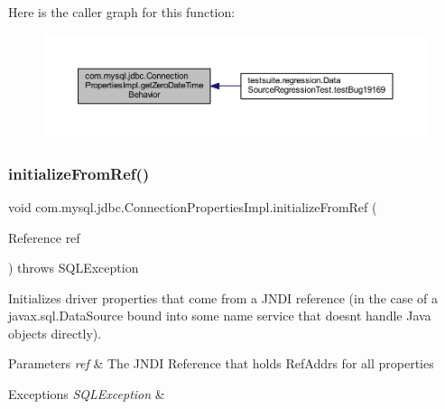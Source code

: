 Here is the caller graph for this function\+:\nopagebreak
\begin{figure}[H]
\begin{center}
\leavevmode
\includegraphics[width=350pt]{classcom_1_1mysql_1_1jdbc_1_1_connection_properties_impl_afdf94172a5573fd5993f1253bf82ac20_icgraph}
\end{center}
\end{figure}
\mbox{\label{classcom_1_1mysql_1_1jdbc_1_1_connection_properties_impl_a38ef6db7230fb0560a58f329b1c92f07}} 
\subsubsection{\texorpdfstring{initialize\+From\+Ref()}{initializeFromRef()}}
{\footnotesize\ttfamily void com.\+mysql.\+jdbc.\+Connection\+Properties\+Impl.\+initialize\+From\+Ref (\begin{DoxyParamCaption}\item[{Reference}]{ref }\end{DoxyParamCaption}) throws S\+Q\+L\+Exception\hspace{0.3cm}{\ttfamily [protected]}}

Initializes driver properties that come from a J\+N\+DI reference (in the case of a javax.\+sql.\+Data\+Source bound into some name service that doesn\textquotesingle{}t handle Java objects directly).


\begin{DoxyParams}{Parameters}
{\em ref} & The J\+N\+DI Reference that holds Ref\+Addrs for all properties \\
\hline
\end{DoxyParams}

\begin{DoxyExceptions}{Exceptions}
{\em S\+Q\+L\+Exception} & \\
\hline
\end{DoxyExceptions}
\mbox{\label{classcom_1_1mysql_1_1jdbc_1_1_connection_properties_impl_a5ba8ddef0c7c382545a2e14ba52596e9}} 
